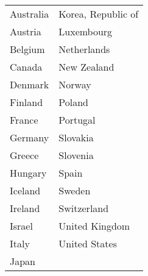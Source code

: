 {\small
\begin{tabular}{ll}
  \hline
  \hline
Australia & Korea, Republic of \\ 
  Austria & Luxembourg \\ 
  Belgium & Netherlands \\ 
  Canada & New Zealand \\ 
  Denmark & Norway \\ 
  Finland & Poland \\ 
  France & Portugal \\ 
  Germany & Slovakia \\ 
  Greece & Slovenia \\ 
  Hungary & Spain \\ 
  Iceland & Sweden \\ 
  Ireland & Switzerland \\ 
  Israel & United Kingdom \\ 
  Italy & United States \\ 
  Japan &  \\ 
   \hline
\end{tabular}
}
